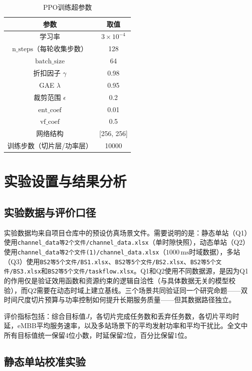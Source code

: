 \documentclass[UTF8,a4paper,12pt,fontset=fandol]{ctexart}
\begin{document}
\begin{table}[htbp]
  \centering
  \caption{PPO训练超参数}
  \label{tab:ppo_params}
  \begin{tabular}{cc}
    \toprule
    参数 & 取值 \\
    \midrule
    学习率 & $3\times10^{-4}$ \\
    $\text{n\_steps}$（每轮收集步数）& 128 \\
    $\text{batch\_size}$ & 64 \\
    折扣因子 $\gamma$ & 0.98 \\
    GAE $\lambda$ & 0.95 \\
    裁剪范围 $\epsilon$ & 0.2 \\
    $\text{ent\_coef}$ & 0.01 \\
    $\text{vf\_coef}$ & 0.5 \\
    网络结构 & [256, 256] \\
    训练步数（切片层/功率层）& 10000 \\
    \bottomrule
  \end{tabular}
\end{table}

\section{实验设置与结果分析}

\subsection{实验数据与评价口径}

实验数据均来自项目仓库中的预设仿真场景文件。需要说明的是：静态单站（Q1）使用\texttt{channel\_data等2个文件/channel\_data.xlsx}（单时隙快照），动态单站（Q2）使用\texttt{channel\_data等2个文件(1)/channel\_data.xlsx}（$1000\,\mathrm{ms}$时域数据），多站（Q3）使用\texttt{BS2等5个文件/BS1.xlsx}、\texttt{BS2等5个文件/BS2.xlsx}、\texttt{BS2等5个文件/BS3.xlsx}和\texttt{BS2等5个文件/taskflow.xlsx}。Q1和Q2使用不同数据源，是因为Q1的作用仅是验证效用函数和资源约束的逻辑自洽性（与具体数据无关的模型校验），而Q2需要在动态时域上建立基线。三个场景共同验证同一个研究命题——双时间尺度切片预算与功率控制如何提升长期服务质量——但其数据路径独立。

评价指标包括：综合目标值$J$，各切片完成任务数和丢弃任务数，各切片平均时延，eMBB平均服务速率，以及多站场景下的平均发射功率和平均干扰比。全文中所有目标值统一保留4位小数，时延保留2位，百分比保留1位。

\subsection{静态单站校准实验}
\end{document}
